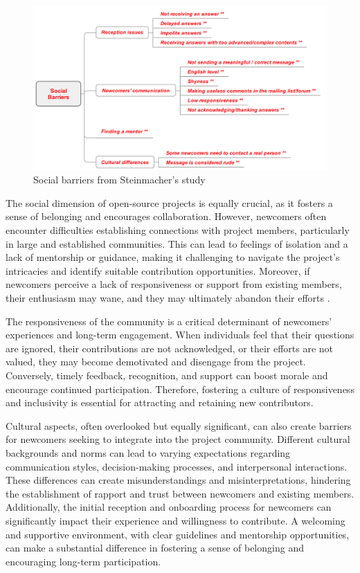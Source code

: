 \begin{figure}[ht]
    \centering
    \includegraphics[width=1\linewidth]{figs/socialbarrier.png}
    \caption{Social barriers from Steinmacher's study \cite{03steinmacher2019overcoming}}
    \label{fig:socialbarrier}
\end{figure}

The social dimension of open-source projects is equally crucial, as it fosters a sense of belonging and encourages collaboration. However, newcomers often encounter difficulties establishing connections with project members, particularly in large and established communities. This can lead to feelings of isolation and a lack of mentorship or guidance, making it challenging to navigate the project's intricacies and identify suitable contribution opportunities. Moreover, if newcomers perceive a lack of responsiveness or support from existing members, their enthusiasm may wane, and they may ultimately abandon their efforts \cite{01steinmacher2015systematic,02steinmacher2015social,03steinmacher2019overcoming,04guizani2021long,14hannebauer2017relationship}.

The responsiveness of the community is a critical determinant of newcomers' experiences and long-term engagement. When individuals feel that their questions are ignored, their contributions are not acknowledged, or their efforts are not valued, they may become demotivated and disengage from the project. Conversely, timely feedback, recognition, and support can boost morale and encourage continued participation. Therefore, fostering a culture of responsiveness and inclusivity is essential for attracting and retaining new contributors.

Cultural aspects, often overlooked but equally significant, can also create barriers for newcomers seeking to integrate into the project community. Different cultural backgrounds and norms can lead to varying expectations regarding communication styles, decision-making processes, and interpersonal interactions. These differences can create misunderstandings and misinterpretations, hindering the establishment of rapport and trust between newcomers and existing members. Additionally, the initial reception and onboarding process for newcomers can significantly impact their experience and willingness to contribute. A welcoming and supportive environment, with clear guidelines and mentorship opportunities, can make a substantial difference in fostering a sense of belonging and encouraging long-term participation.


